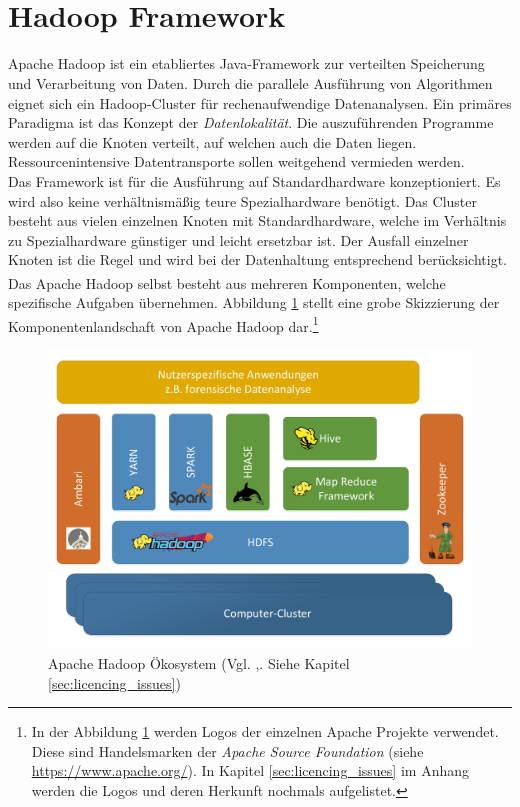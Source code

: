 \section{Hadoop\textsuperscript{\textregistered} Framework}
\label{sec:theory_hadoop}
\noindent
Apache Hadoop ist ein etabliertes Java-Framework zur verteilten Speicherung und Verarbeitung von Daten. Durch die parallele Ausführung von Algorithmen eignet sich ein Hadoop-Cluster für rechenaufwendige Datenanalysen. Ein primäres Paradigma ist das Konzept der \textit{Datenlokalität}. Die auszuführenden Programme werden auf die Knoten verteilt, auf welchen auch die Daten liegen. Ressourcenintensive Datentransporte sollen weitgehend vermieden werden.\cite[S. 20 ff.]{big_data_praxis}\\ 
Das Framework ist für die Ausführung auf Standardhardware konzeptioniert. Es wird also keine verhältnismäßig teure Spezialhardware benötigt. Das Cluster besteht aus vielen einzelnen Knoten mit Standardhardware, welche im Verhältnis zu Spezialhardware günstiger und leicht ersetzbar ist. Der Ausfall einzelner Knoten ist die Regel und wird bei der Datenhaltung entsprechend berücksichtigt. \\

\noindent
Das Apache Hadoop\textsuperscript{\textregistered} selbst besteht aus mehreren Komponenten, welche spezifische Aufgaben übernehmen. Abbildung \ref{fig:hadoop_framework_structure} stellt eine grobe Skizzierung der Komponentenlandschaft von Apache Hadoop dar.\footnote{In der Abbildung \ref{fig:hadoop_framework_structure} werden Logos der einzelnen Apache Projekte verwendet. Diese sind Handelsmarken der \textit{Apache Source Foundation} (siehe \url{https://www.apache.org/}). In Kapitel \ref{sec:licencing_issues} im Anhang werden die Logos und deren Herkunft nochmals aufgelistet.}\\

\begin{figure}[ht]
  \centering
  \includegraphics[width=\textwidth]{./resource/hadoop_framework_structure.pdf}
  \caption{Apache Hadoop Ökosystem (Vgl. \cite{big_data_praxis},\cite{expert_hadoop_admin}. Siehe Kapitel \ref{sec:licencing_issues})}
  \label{fig:hadoop_framework_structure}
\end{figure}


